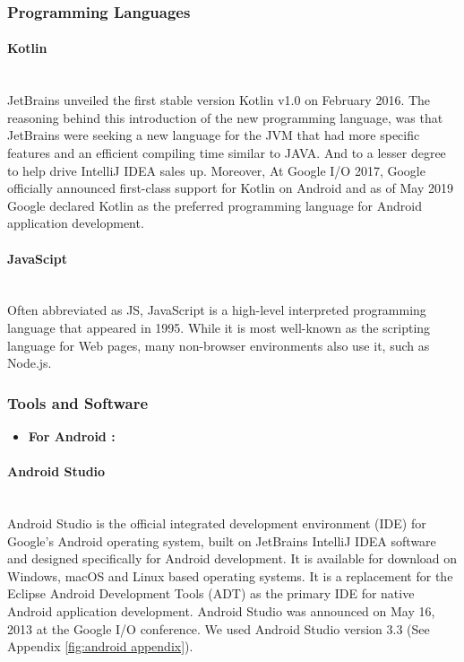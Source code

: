 \subsubsection{Programming Languages}
\paragraph{Kotlin}~\\
JetBrains unveiled the first stable version Kotlin v1.0 on February 2016. The reasoning behind this introduction of the new programming language, was that JetBrains were seeking a new language for the JVM that had more specific features and an efficient compiling time similar to JAVA. And to a lesser degree to help drive IntelliJ IDEA sales up. Moreover, At Google I/O 2017, Google officially announced first-class support for Kotlin on Android and as of May 2019 Google declared Kotlin as the preferred programming language for Android application development.\cite{14}

\paragraph{JavaScipt}~\\
Often abbreviated as JS, JavaScript is a high-level interpreted programming language that appeared in 1995. While it is most well-known as the scripting language for Web pages, many non-browser environments also use it, such as Node.js.\cite{15}

\subsubsection{Tools and Software}
\begin{itemize}
    \item \textbf{For Android :}
\end{itemize}
\paragraph{Android Studio}~\\
Android Studio is the official integrated development environment (IDE) for Google's Android operating system, built on JetBrains IntelliJ IDEA software and designed specifically for Android development. It is available for download on Windows, macOS and Linux based operating systems. It is a replacement for the Eclipse Android Development Tools (ADT) as the primary IDE for native Android application development.
Android Studio was announced on May 16, 2013 at the Google I/O conference\cite{16}. We used Android Studio version 3.3 (See Appendix \ref{fig:android appendix}).

